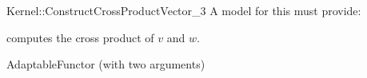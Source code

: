 \begin{ccRefFunctionObjectConcept}{Kernel::ConstructCrossProductVector_3}
A model for this must provide:



            {computes the cross product of $v$ and $w$.}

\ccRefines
AdaptableFunctor (with two arguments)

\ccSeeAlso

\\
\\

\end{ccRefFunctionObjectConcept}
